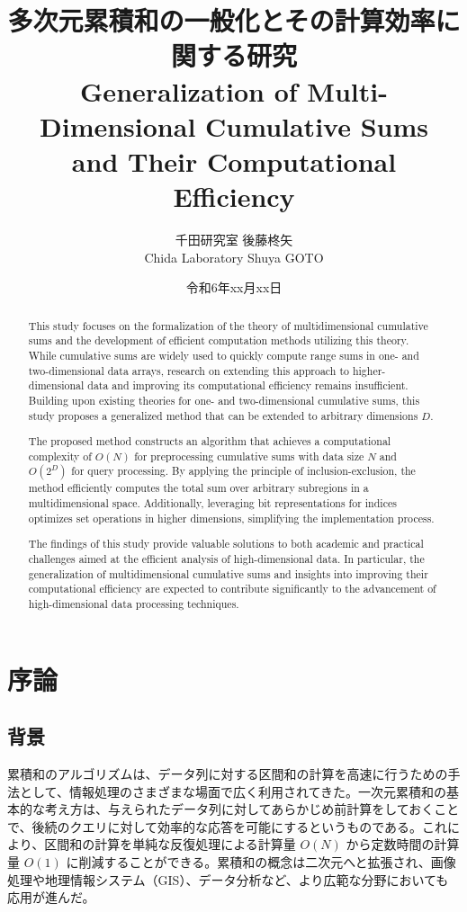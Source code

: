 \documentclass[11pt]{jsreport}
\title{多次元累積和の一般化とその計算効率に関する研究 \\Generalization of Multi-Dimensional Cumulative Sums \\ and Their Computational Efficiency}
\author{千田研究室 \quad 後藤柊矢\\Chida Laboratory \quad Shuya GOTO}
\date{令和6年xx月xx日}
\theoremstyle{plain} %
\theoremstyle{definition}
\begin{document}
\maketitle

\renewcommand{\abstractname}{Abstract}
\begin{abstract}
This study focuses on the formalization of the theory of multidimensional cumulative sums and the development of efficient computation methods utilizing this theory. While cumulative sums are widely used to quickly compute range sums in one- and two-dimensional data arrays, research on extending this approach to higher-dimensional data and improving its computational efficiency remains insufficient. Building upon existing theories for one- and two-dimensional cumulative sums, this study proposes a generalized method that can be extended to arbitrary dimensions \(D\).

The proposed method constructs an algorithm that achieves a computational complexity of \({O}(N)\) for preprocessing cumulative sums with data size \(N\) and \({O}(2^D)\) for query processing. By applying the principle of inclusion-exclusion, the method efficiently computes the total sum over arbitrary subregions in a multidimensional space. Additionally, leveraging bit representations for indices optimizes set operations in higher dimensions, simplifying the implementation process.

The findings of this study provide valuable solutions to both academic and practical challenges aimed at the efficient analysis of high-dimensional data. In particular, the generalization of multidimensional cumulative sums and insights into improving their computational efficiency are expected to contribute significantly to the advancement of high-dimensional data processing techniques.

\end{abstract}

\tableofcontents

\chapter{序論}

\section{背景}

累積和のアルゴリズムは、データ列に対する区間和の計算を高速に行うための手法として、情報処理のさまざまな場面で広く利用されてきた。一次元累積和の基本的な考え方は、与えられたデータ列に対してあらかじめ前計算をしておくことで、後続のクエリに対して効率的な応答を可能にするというものである。これにより、区間和の計算を単純な反復処理による計算量 \({O}(N)\) から定数時間の計算量 \({O}(1)\) に削減することができる。累積和の概念は二次元へと拡張され、画像処理や地理情報システム（GIS）、データ分析など、より広範な分野においても応用が進んだ。
\end{document}
